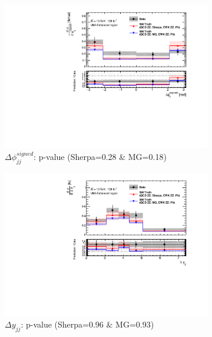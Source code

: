 \begin{figure}[!htbp]
\begin{subfigure}{.49\textwidth}
        \centering
        \includegraphics[width=.98\linewidth]{figures/Results/CrossSection_VBSEnhanced/xs_dphi_SR.pdf}
        \caption{ \footnotesize{$\Delta \phi _{jj}^{signed}$: p-value (Sherpa=0.28 $\&$ MG=0.18)} }
    \end{subfigure}
    \begin{subfigure}{.49\textwidth}
        \centering
        \includegraphics[width=.98\linewidth]{figures/Results/CrossSection_VBSEnhanced/xs_dy_SR.pdf}
        \caption{ \footnotesize{$\Delta y_{jj}$: p-value (Sherpa=0.96 $\&$ MG=0.93)} }
    \end{subfigure}\\
    \begin{subfigure}{.49\textwidth}
        \centering

\end{subfigure}
\end{figure}
